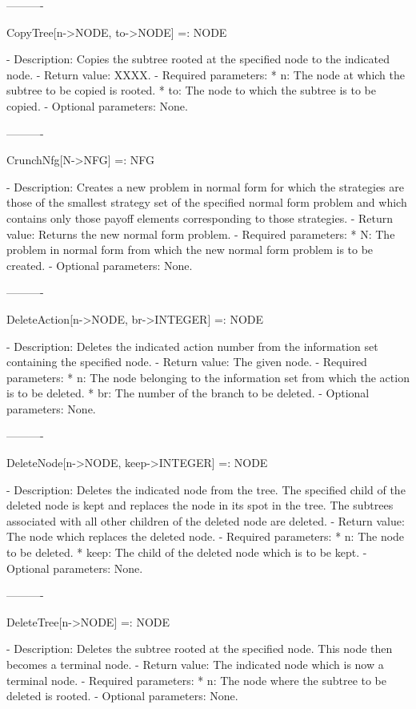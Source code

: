 {----------

CopyTree[n->NODE, to->NODE] =: NODE

   -	Description:  Copies the subtree rooted at the specified node to the 
	indicated node.
   -	Return value:  XXXX.
   -	Required parameters:
	  *  n:  The node at which the subtree to be copied is rooted.
	  *  to:  The node to which the subtree is to be copied.
   -	Optional parameters:  None.

----------

CrunchNfg[N->NFG] =: NFG

   -	Description:  Creates a new problem in normal form for which the 
	strategies are those of the smallest strategy set of the specified 
	normal form problem and which contains only those payoff elements
	corresponding to those strategies.
   -	Return value:  Returns the new normal form problem.
   -	Required parameters:
	  *  N:  The problem in normal form from which the new normal form 
		problem is to be created.
   -	Optional parameters:  None.

----------

DeleteAction[n->NODE, br->INTEGER] =: NODE

   -	Description:  Deletes the indicated action number from the information
	set containing the specified node.
   -	Return value:  The given node.
   -	Required parameters:
	  *  n:  The node belonging to the information set from which the 
		action is to be deleted.
	  *  br:  The number of the branch to be deleted.
   -	Optional parameters:  None.

----------

DeleteNode[n->NODE, keep->INTEGER] =: NODE

   -	Description:  Deletes the indicated node from the tree.  The specified
	child of the deleted node is kept and replaces the node in its spot in
	the tree.  The subtrees associated with all other children of the 
	deleted node are deleted.
   -	Return value:  The node which replaces the deleted node.
   -	Required parameters:
	  *  n:  The node to be deleted.
	  *  keep:  The child of the deleted node which is to be kept.
   -	Optional parameters:  None.

----------

DeleteTree[n->NODE] =: NODE

   -	Description:  Deletes the subtree rooted at the specified node.  This 
	node then becomes a terminal node.
   -	Return value:  The indicated node which is now a terminal node.
   -	Required parameters:
	  *  n:  The node where the subtree to be deleted is rooted.
   -	Optional parameters:  None.

}
